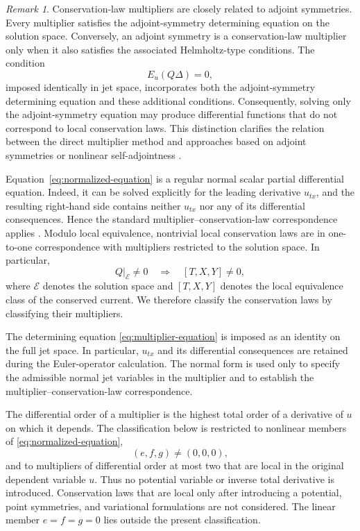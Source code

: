 \documentclass[11pt]{article}
\numberwithin{equation}{section}
\theoremstyle{definition}
\theoremstyle{remark}
\newtheorem{remark}[theorem]{Remark}
\begin{document}
\begin{remark}
\label{rem:adjoint-symmetries}
Conservation-law multipliers are closely related to adjoint
symmetries. Every multiplier satisfies the adjoint-symmetry
determining equation on the solution space. Conversely, an adjoint
symmetry is a conservation-law multiplier only when it also satisfies
the associated Helmholtz-type conditions. The condition
\[
E_u\!\left(Q\Delta\right)=0,
\]
imposed identically in jet space, incorporates both the
adjoint-symmetry determining equation and these additional
conditions. Consequently, solving only the adjoint-symmetry equation
may produce differential functions that do not correspond to local
conservation laws. This distinction clarifies the relation between
the direct multiplier method and approaches based on adjoint
symmetries or nonlinear self-adjointness
\cite{Ibragimov2011,IbragimovAvdonina2013,Ma2018}.
\end{remark}

Equation~\eqref{eq:normalized-equation} is a regular normal scalar
partial differential equation. Indeed, it can be solved explicitly
for the leading derivative $u_{tx}$, and the resulting right-hand
side contains neither $u_{tx}$ nor any of its differential
consequences. Hence the standard multiplier--conservation-law
correspondence applies
\cite{AncoBluman2002a,AncoBluman2002b}. Modulo local equivalence,
nontrivial local conservation laws are in one-to-one correspondence
with multipliers restricted to the solution space. In particular,
\begin{equation*}
Q\big|_{\mathcal{E}}\neq0
\quad\Longrightarrow\quad
[T,X,Y]\neq0,
\end{equation*}
where $\mathcal{E}$ denotes the solution space and $[T,X,Y]$ denotes
the local equivalence class of the conserved current. We therefore
classify the conservation laws by classifying their multipliers.

The determining equation \eqref{eq:multiplier-equation} is imposed as
an identity on the full jet space. In particular, $u_{tx}$ and its
differential consequences are retained during the Euler-operator
calculation. The normal form is used only to specify the admissible
normal jet variables in the multiplier and to establish the
multiplier--conservation-law correspondence.

The differential order of a multiplier is the highest total order of
a derivative of $u$ on which it depends. The classification below is
restricted to nonlinear members of
\eqref{eq:normalized-equation},
\begin{equation*}
(e,f,g)\neq(0,0,0),
\end{equation*}
and to multipliers of differential order at most two that are local
in the original dependent variable $u$. Thus no potential variable
or inverse total derivative is introduced. Conservation laws that are
local only after introducing a potential, point symmetries, and
variational formulations are not considered. The linear member $e=f=g=0$ lies outside the present classification.
\end{document}
